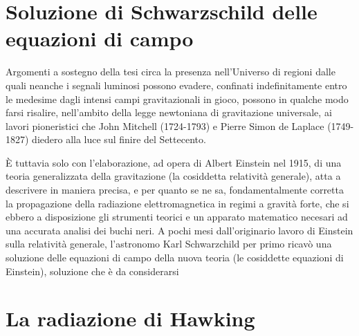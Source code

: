 \section{Soluzione di Schwarzschild delle equazioni di campo}
Argomenti a sostegno della tesi circa la presenza nell'Universo di regioni dalle quali neanche i segnali luminosi possono evadere, confinati indefinitamente entro le medesime dagli intensi campi gravitazionali in gioco, possono in qualche modo farsi risalire, nell'ambito della legge newtoniana di gravitazione universale, ai lavori pioneristici che John Mitchell (1724-1793) e Pierre Simon de Laplace (1749-1827) diedero alla luce sul finire del Settecento.
\par
\`E tuttavia solo con l'elaborazione, ad opera di Albert Einstein nel 1915, di una teoria generalizzata della gravitazione (la cosiddetta relativit\`a generale), atta a descrivere in maniera precisa, e per quanto se ne sa, fondamentalmente corretta la propagazione della radiazione elettromagnetica in regimi a gravit\`a forte, che si ebbero a disposizione gli strumenti teorici e un apparato matematico necesari ad una accurata analisi dei buchi neri.
A pochi mesi dall'originario lavoro di Einstein sulla relativit\`a generale,
l'astronomo Karl Schwarzchild per primo ricav\`o una soluzione delle equazioni
di campo della nuova teoria (le cosiddette equazioni di Einstein), soluzione che
\`e  da considerarsi


\section{La radiazione di Hawking}





